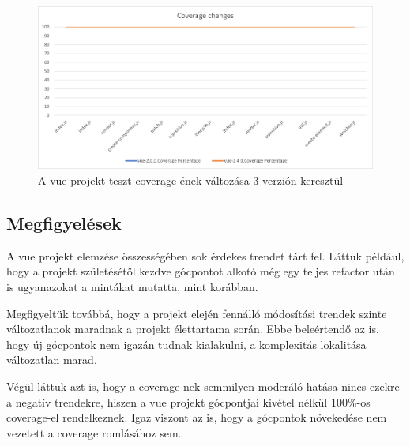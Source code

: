 \begin{figure}[H]
    \centering
    \includegraphics[width=1\textwidth]{images/vue/vue-all-coverage.png}
    \caption{A vue projekt teszt coverage-ének változása 3 verzión keresztül}
    \label{fig:vue-all-coverage}
\end{figure}

\subsection{Megfigyelések}

A vue projekt elemzése összességében sok érdekes trendet tárt fel. Láttuk például, hogy a projekt születésétől kezdve gócpontot alkotó  még egy teljes refactor után is ugyanazokat a mintákat mutatta, mint korábban.

Megfigyeltük továbbá, hogy a projekt elején fennálló módosítási trendek szinte változatlanok maradnak a projekt élettartama során. Ebbe beleértendő az is, hogy új gócpontok nem igazán tudnak kialakulni, a komplexitás lokalitása változatlan marad.

Végül láttuk azt is, hogy a coverage-nek semmilyen moderáló hatása nincs ezekre a negatív trendekre, hiszen a vue projekt gócpontjai kivétel nélkül 100\%-os coverage-el rendelkeznek. Igaz viszont az is, hogy a gócpontok növekedése nem vezetett a coverage romlásához sem.

